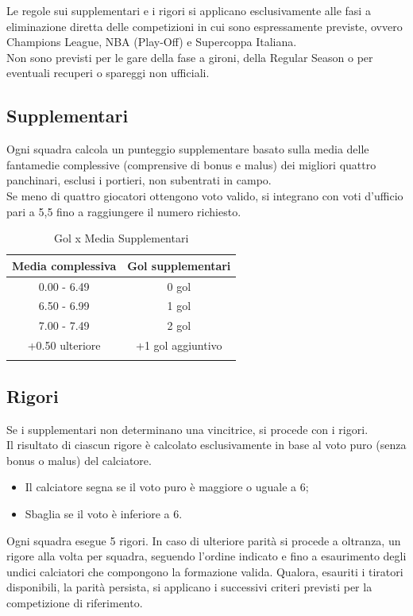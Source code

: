 Le regole sui supplementari e i rigori si applicano esclusivamente alle fasi a eliminazione diretta delle competizioni in cui sono espressamente previste, ovvero Champions League, NBA (Play-Off) e Supercoppa Italiana.\\
Non sono previsti per le gare della fase a gironi, della Regular Season o per eventuali recuperi o spareggi non ufficiali.

\subsection{Supplementari}
\label{art:9.5.1}

Ogni squadra calcola un punteggio supplementare basato sulla media delle fantamedie complessive (comprensive di bonus e malus) dei migliori quattro panchinari, esclusi i portieri, non subentrati in campo.\\
Se meno di quattro giocatori ottengono voto valido, si integrano con voti d'ufficio pari a 5,5 fino a raggiungere il numero richiesto.

\begin{longtable}{|c|c|}
\hline
\textbf{Media complessiva} & \textbf{Gol supplementari} \\
\hline
0.00 - 6.49 & 0 gol \\ \hline
6.50 - 6.99 & 1 gol \\ \hline
7.00 - 7.49 & 2 gol \\ \hline
+0.50 ulteriore & +1 gol aggiuntivo \\
\hline

\caption{Gol x Media Supplementari}
\end{longtable}

\subsection{Rigori}
\label{art:9.5.2}

Se i supplementari non determinano una vincitrice, si procede con i rigori.\\
Il risultato di ciascun rigore è calcolato esclusivamente in base al voto puro (senza bonus o malus) del calciatore.

\begin{itemize}
\item Il calciatore segna se il voto puro è maggiore o uguale a 6;
\item Sbaglia se il voto è inferiore a 6.
\end{itemize}

Ogni squadra esegue 5 rigori. In caso di ulteriore parità si procede a oltranza, un rigore alla volta per squadra, seguendo l'ordine indicato e fino a esaurimento degli undici calciatori che compongono la formazione valida. Qualora, esauriti i tiratori disponibili, la parità persista, si applicano i successivi criteri previsti per la competizione di riferimento.

